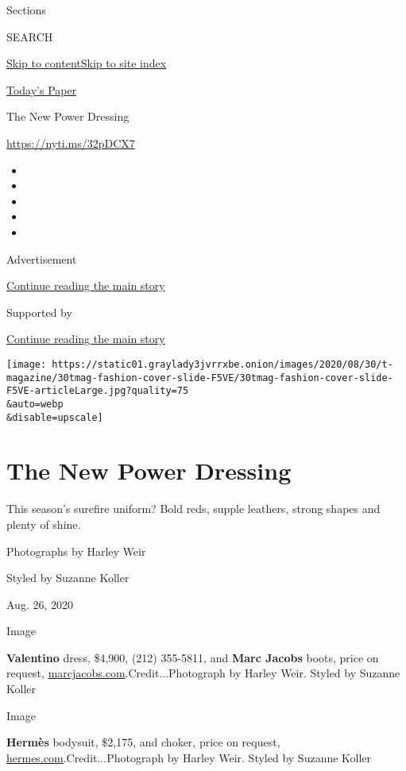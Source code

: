 Sections

SEARCH

\protect\hyperlink{site-content}{Skip to
content}\protect\hyperlink{site-index}{Skip to site index}

\href{https://myaccount.nytimes3xbfgragh.onion/auth/login?response_type=cookie\&client_id=vi}{}

\href{https://www.nytimes3xbfgragh.onion/section/todayspaper}{Today's
Paper}

The New Power Dressing

\url{https://nyti.ms/32pDCX7}

\begin{itemize}
\item
\item
\item
\item
\item
\end{itemize}

Advertisement

\protect\hyperlink{after-top}{Continue reading the main story}

Supported by

\protect\hyperlink{after-sponsor}{Continue reading the main story}

\texttt{[image: https://static01.graylady3jvrrxbe.onion/images/2020/08/30/t-magazine/30tmag-fashion-cover-slide-F5VE/30tmag-fashion-cover-slide-F5VE-articleLarge.jpg?quality=75\\\&auto=webp\\\&disable=upscale]}

\hypertarget{the-new-power-dressing}{%
\section{The New Power Dressing}\label{the-new-power-dressing}}

This season's surefire uniform? Bold reds, supple leathers, strong
shapes and plenty of shine.

Photographs by Harley Weir

Styled by Suzanne Koller

Aug. 26, 2020

Image

\textbf{Valentino} dress, \$4,900, (212) 355-5811, and \textbf{Marc
Jacobs} boots, price on request,
\href{https://www.marcjacobs.com}{marcjacobs.com}.Credit...Photograph by
Harley Weir. Styled by Suzanne Koller

Image

\textbf{Hermès} bodysuit, \$2,175, and choker, price on request,
\href{https://www.hermes.com}{hermes.com}.Credit...Photograph by Harley
Weir. Styled by Suzanne Koller

